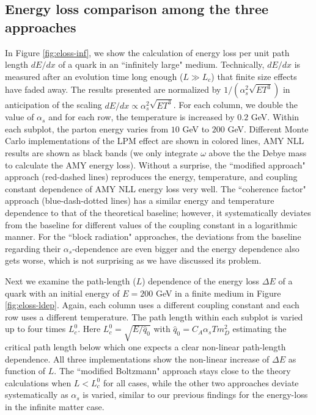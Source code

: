 \subsection{Energy loss comparison among the three approaches}
In Figure \ref{fig:eloss-inf}, we show the calculation of energy loss per unit path length $dE/dx$ of a quark in an ``infinitely large" medium. 
Technically, $dE/dx$ is measured after an evolution time long enough ($L\gg L_c$) that finite size effects have faded away.
The results presented are normalized by $1/(\alpha_s^2 \sqrt{ET^3})$ in anticipation of the scaling $dE/dx \propto \alpha_s^2 \sqrt{ET^3}$.
For each column, we double the value of $\alpha_s$ and for each row, the temperature is increased by $0.2$ GeV. 
Within each subplot, the parton energy varies from $10$ GeV to $200$ GeV.
Different Monte Carlo implementations of the LPM effect are shown in colored lines, AMY NLL results are shown as black bands (we only integrate $\omega$ above the the Debye mass to calculate the AMY energy loss). 
Without a surprise, the ``modified approach" approach (red-dashed lines) reproduces the energy, temperature, and coupling constant dependence of AMY NLL energy loss very well.
The ``coherence factor" approach (blue-dash-dotted lines) has a similar energy and temperature dependence to that of the theoretical baseline; however, it systematically deviates from the baseline for different values of the coupling constant in a logarithmic manner.
For the ``block radiation" approaches, the deviations from the baseline regarding their $\alpha_s$-dependence are even bigger and the energy dependence also gets worse, which is not surprising as we have discussed its problem.

Next we examine the path-length ($L$) dependence of the energy loss $\Delta E$ of a quark with an initial energy of $E = 200$ GeV in a finite medium in Figure \ref{fig:eloss-ldep}.
Again, each column uses a different coupling constant and each row uses a different temperature. 
The path length within each subplot is varied up to four times $L_c^0$.
Here $L_c^0 = \sqrt{E/\hat{q}_0}$ with $\hat{q}_0 = C_A \alpha_s T m_D^2$ estimating the critical path length below which one expects a clear non-linear path-length dependence.
All three implementations show the non-linear increase of $\Delta E$ as function of $L$.
The ``modified Boltzmann" approach stays close to the theory calculations when $L<L_c^0$ for all cases, while the other two approaches deviate systematically as $\alpha_s$ is varied, similar to our previous findings for the energy-loss in the infinite matter case.

